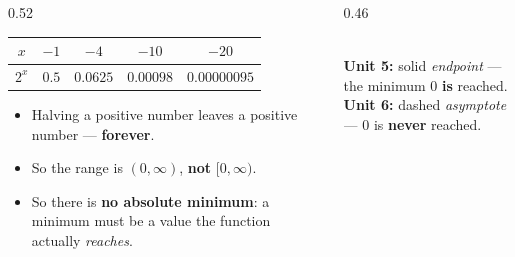 \documentclass[aspectratio=169, 11pt]{beamer}
\newcommand{\lgrid}[4]{%
  \draw[step=1, linegray!45, thin] (#1,#3) grid (#2,#4);
  \draw[->, thick, charcoal] (#1,0)--(#2,0) node[below right, font=\tiny]{$x$};
  \draw[->, thick, charcoal] (0,#3)--(0,#4) node[left, font=\tiny]{$y$};}
\newcommand{\expcurve}[4]{\draw[very thick, forest, domain=#3:#4, samples=120, smooth]
  plot (\x,{#1*exp((#2)*(\x))});}
\begin{document}
\begin{frame}[t, plain]
  \begin{columns}[T]
    \begin{column}{0.52\textwidth}
      \begin{center}
      \renewcommand{\arraystretch}{1.3}
      \begin{tabular}{|c|c|c|c|c|}
      \hline
      $x$ & $-1$ & $-4$ & $-10$ & $-20$ \\ \hline
      $2^{x}$ & $0.5$ & $0.0625$ & $0.00098$ & $0.00000095$ \\ \hline
      \end{tabular}
      \end{center}
      \vspace{4pt}
      \begin{itemize}\setlength{\itemsep}{4pt}
        \item Halving a positive number leaves a positive number --- \textbf{forever}.
        \item So the range is $(0,\infty)$, \textbf{not} $[0,\infty)$.
        \item So there is \textbf{no absolute minimum}: a minimum must be a value the function
              actually \emph{reaches}.
      \end{itemize}
    \end{column}
    \begin{column}{0.46\textwidth}
      \centering
      \\[3pt]
      {\footnotesize \textbf{Unit 5:} solid \emph{endpoint} --- the minimum $0$ \textbf{is} reached.
      \\[2pt]
      \textbf{Unit 6:} dashed \emph{asymptote} --- $0$ is \textbf{never} reached.}
    \end{column}
  \end{columns}
\end{frame}
\end{document}
